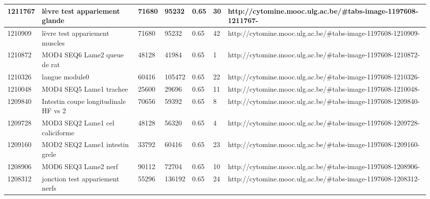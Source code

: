 \documentclass[a4paper,11pt]{report}
\numberwithin{figure}{section} %
\begin{document}
\begin{table}[]
{\begin{tabular}{|l|l|l|l|l|l|l|}
1211767  & l\`{e}vre test appariement glande                                                                & 71680  & 95232  & 0.65                  & 30          & http://cytomine.mooc.ulg.ac.be/\#tabs-image-1197608-1211767-  \\ \hline
1210909  & l\`{e}vre test appariement muscles                                                               & 71680  & 95232  & 0.65                  & 42          & http://cytomine.mooc.ulg.ac.be/\#tabs-image-1197608-1210909-  \\ \hline
1210872  & MOD4 SEQ6 Lame2 queue de rat                                                                 & 48128  & 41984  & 0.65                  & 1           & http://cytomine.mooc.ulg.ac.be/\#tabs-image-1197608-1210872-  \\ \hline
1210326  & langue module0                                                                               & 60416  & 105472 & 0.65                  & 22          & http://cytomine.mooc.ulg.ac.be/\#tabs-image-1197608-1210326-  \\ \hline
1210048  & MOD4 SEQ5 Lame1 trachee                                                                      & 25600  & 29696  & 0.65                  & 11          & http://cytomine.mooc.ulg.ac.be/\#tabs-image-1197608-1210048-  \\ \hline
1209840  & Intestin coupe longitudinale HF vs 2                                                         & 70656  & 59392  & 0.65                  & 8           & http://cytomine.mooc.ulg.ac.be/\#tabs-image-1197608-1209840-  \\ \hline
1209728  & MOD3 SEQ2 Lame1 cel caliciforme                                                              & 48128  & 56320  & 0.65                  & 4           & http://cytomine.mooc.ulg.ac.be/\#tabs-image-1197608-1209728-  \\ \hline
1209160  & MOD2 SEQ2 Lame1 intestin grele                                                               & 33792  & 60416  & 0.65                  & 23          & http://cytomine.mooc.ulg.ac.be/\#tabs-image-1197608-1209160-  \\ \hline
1208906  & MOD6 SEQ3 Lame2 nerf                                                                         & 90112  & 72704  & 0.65                  & 10          & http://cytomine.mooc.ulg.ac.be/\#tabs-image-1197608-1208906-  \\ \hline
1208312  & jonction test appariement nerfs                                                              & 55296  & 136192 & 0.65                  & 24          & http://cytomine.mooc.ulg.ac.be/\#tabs-image-1197608-1208312-  \\ \hline

\end{tabular}}
\end{table}
\end{document}
